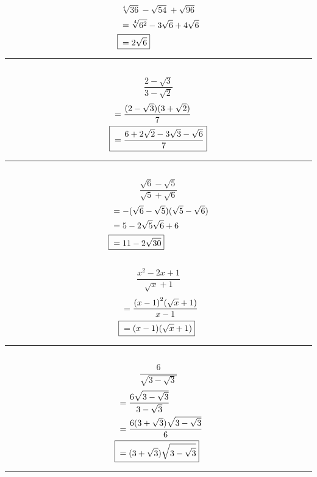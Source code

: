 	\subsection{}
		\[\sqrt[4]{36} - \sqrt{54} + \sqrt{96}\]
		\begin{align*}
			&= \sqrt[4]{6^2} - 3\sqrt{6} + 4\sqrt{6} \\
			\Aboxed{{} &= 2\sqrt{6}} \\
		\end{align*}
		\hrule{}

	\subsection{}
		\[\frac{2 - \sqrt{3}}{3 - \sqrt{2}}\]
		\begin{align*}
			&= \frac{(2 - \sqrt{3})(3 + \sqrt{2})}{7} \\
			\Aboxed{{} &= \frac{6 + 2\sqrt{2} - 3\sqrt{3} - \sqrt{6}}{7}}
		\end{align*}
		\hrule{}

	\subsection{}
		\[\frac{\sqrt{6} - \sqrt{5}}{\sqrt{5} + \sqrt{6}}\]
		\begin{align*}
			&= -(\sqrt{6} - \sqrt{5})(\sqrt{5} - \sqrt{6}) \\
			&= 5 - 2\sqrt{5}{\sqrt{6}} + 6 \\
			\Aboxed{{} &= 11 - 2\sqrt{30}}
		\end{align*}

	\subsection{}
		\[\frac{x^2 - 2x + 1}{\sqrt{x} + 1}\]
		\begin{align*}
			&= \frac{{(x - 1)}^2(\sqrt{x} + 1)}{x - 1} \\
			\Aboxed{{} &= (x - 1)(\sqrt{x} + 1)}
		\end{align*}
		\hrule{}

	\subsection{}
		\[\frac{6}{\sqrt{3 - \sqrt{3}}}\]
		\begin{align*}
			&= \frac{6\sqrt{3 - \sqrt{3}}}{3 - \sqrt{3}} \\
			&= \frac{6(3 + \sqrt{3})\sqrt{3 - \sqrt{3}}}{6} \\
			\Aboxed{{} &= (3 + \sqrt{3})\sqrt{3 - \sqrt{3}}}
		\end{align*}
		\hrule{}

